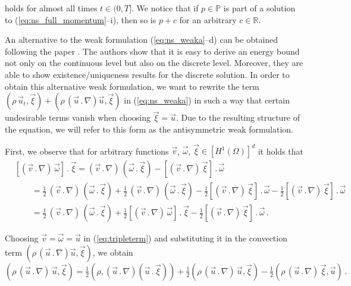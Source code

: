 \documentclass[a4paper,12pt,onecolumn]{article}
\newcommand{\R}{\mathbb R}
\newcommand{\pspace}{\mathbb{P}}
\begin{document}
holds for almost all times $t \in (0,T]$. We notice that if $p \in \pspace$ is
part of a solution to (\ref{eq:ns_full_momentum}--i), then so is $p + c$ for an
arbitrary $c\in \R$.

An alternative to the weak formulation (\ref{eq:ns_weaka}--d) can be obtained
following the paper \cite{fluidfbp}. The authors show that it is easy to derive
an energy bound not only on the continuous level but also on the discrete
level. Moreover, they are able to show existence/uniqueness results for the
discrete solution. In order to obtain this
alternative weak formulation, we want to rewrite the term $\left(\rho\,\vec u_t,
\vec \xi\right) + \left(\rho\,(\vec u \,.\, \nabla) \vec u,\vec \xi\right)$ in
(\ref{eq:ns_weaka}) in such a way that certain undesirable terms vanish when
choosing $\vec \xi = \vec u$. Due to the resulting structure of the equation,
we will refer to this form as the antisymmetric weak formulation.

First, we observe that for arbitrary functions $\vec v$,
$\vec \omega$, $\vec \xi \in [H^1(\Omega)]^d$ it holds that
\begin{align}\label{eq:tripleterm}
& [(\vec v\,.\,\nabla)\,\vec \omega]\,.\,\vec \xi
 = (\vec v\,.\,\nabla)\,(\vec \omega\,.\,\vec \xi) -
[(\vec v\,.\,\nabla)\,\vec \xi]\,.\,\vec \omega \nonumber \\
& \qquad = \tfrac{1}{2}\,(\vec v\,.\,\nabla)\,
(\vec \omega\,.\,\vec \xi) + \tfrac{1}{2}\,(\vec v\,.\,\nabla)\,
(\vec \omega\,.\,\vec \xi) -\tfrac{1}{2}[(\vec v\,.\,\nabla)\,\vec
\xi] \,.\,\vec \omega -\tfrac{1}{2}[(\vec v\,.\,\nabla)\,\vec
\xi] \,.\,\vec \omega \nonumber \\
& \qquad = \tfrac{1}{2}\,(\vec v\,.\,\nabla)\, (\vec \omega\,.\,\vec \xi) +
\tfrac{1}{2}[(\vec v\,.\,\nabla)\,\vec \omega]\,.\,\vec \xi -
\tfrac{1}{2}[(\vec v\,.\,\nabla)\,\vec \xi] \,.\,\vec \omega\,.
\end{align}

Choosing $\vec v = \vec \omega = \vec u$ in (\ref{eq:tripleterm}) and
substituting it in the convection term $\left(\rho\,(\vec u \,.\, \nabla)
\vec u,\vec \xi\right)$, we obtain
\begin{equation}\label{eq:ns_advect_tripleterm}
( \rho\,(\vec u \,.\,\nabla)\,\vec u, \vec \xi) =
\tfrac{1}{2}(\rho,(\vec u\,.\,\nabla)(\vec u\,.\,\vec \xi))
+ \tfrac{1}{2}(\rho\,(\vec u \,.\,\nabla)\,\vec u, \vec \xi)
-\tfrac{1}{2}(\rho\,(\vec u\,.\,\nabla)\,\vec \xi,\vec u)\,.
\end{equation}
\end{document}
